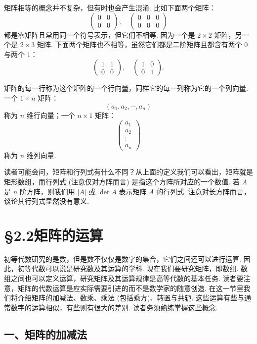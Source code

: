 \documentclass[UTF8, 12pt, fontset=fandol, oneside]{ctexart}
\begin{document}
矩阵相等的概念并不复杂，但有时也会产生混淆. 比如下面两个矩阵：
\[
\left(\begin{array}{cc}
0 & 0\\
0 & 0
\end{array}\right),\quad
\left(\begin{array}{ccc}
0 & 0 & 0\\
0 & 0 & 0
\end{array}\right)
\]
都是零矩阵且常用同一个符号表示，但它们不相等. 因为一个是 $2\times 2$ 矩阵，另一个是 $2\times 3$ 矩阵. 下面两个矩阵也不相等，虽然它们都是二阶矩阵且都含有两个 $0$ 与两个 $1$：
\[
\left(\begin{array}{cc}
1 & 1\\
0 & 0
\end{array}\right),\quad
\left(\begin{array}{cc}
1 & 0\\
0 & 1
\end{array}\right).
\]

矩阵的每一行称为这个矩阵的一个行向量，同样它的每一列称为它的一个列向量. 一个 $1\times n$ 矩阵：
\[
(a_1,a_2,\cdots,a_n)
\]
称为 $n$ 维行向量；一个 $n\times 1$ 矩阵：
\[
\left(\begin{array}{c}
a_1\\
a_2\\
\vdots\\
a_n
\end{array}\right)
\]
称为 $n$ 维列向量.

读者可能会问，矩阵和行列式有什么不同？从上面的定义我们可以看出，矩阵就是矩形数组，而行列式 (注意仅对方阵而言) 是指这个方阵所对应的一个数值. 若 $A$ 是 $n$ 阶方阵，则我们用 $|A|$ 或 $\det A$ 表示矩阵 $A$ 的行列式. 注意对长方阵而言，谈论其行列式显然没有意义.

\section*{§2.2\quad 矩阵的运算}

初等代数研究的是数，但是数不仅仅是数字的集合，它们之间还可以进行运算. 因此，初等代数可以说是研究数及其运算的学科. 现在我们要研究矩阵，即数组. 数组之间也可以定义运算，研究矩阵及其运算规律是高等代数的基本任务. 读者要注意，矩阵的代数运算是应实际需要引进的而不是数学家的随意创造. 在这一节里我们将介绍矩阵的加减法、数乘、乘法 (包括乘方)、转置与共轭. 这些运算有些与通常数字的运算相似，有些则有很大的差别. 读者务须熟练掌握这些概念.

\subsection*{一、矩阵的加减法}
\end{document}
